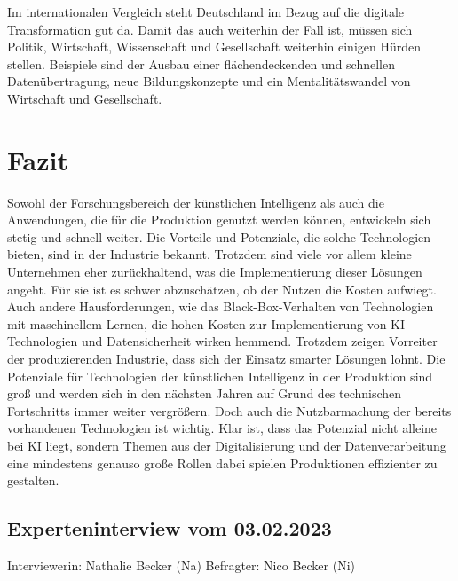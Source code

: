 \documentclass[a4paper,12pt, german]{report}
\begin{document}
Im internationalen Vergleich steht Deutschland im Bezug auf die digitale Transformation gut da. Damit das auch weiterhin der Fall ist, müssen sich Politik, Wirtschaft, Wissenschaft und Gesellschaft weiterhin einigen Hürden stellen. Beispiele sind der Ausbau einer flächendeckenden und schnellen Datenübertragung, neue Bildungskonzepte und ein Mentalitätswandel von Wirtschaft und Gesellschaft.\cite{36}

\chapter{Fazit}

Sowohl der Forschungsbereich der künstlichen Intelligenz als auch die Anwendungen, die für die Produktion genutzt werden können, entwickeln sich stetig und schnell weiter. Die Vorteile und Potenziale, die solche Technologien bieten, sind in der Industrie bekannt. Trotzdem sind viele vor allem kleine Unternehmen eher zurückhaltend, was die Implementierung dieser Lösungen angeht. Für sie ist es schwer abzuschätzen, ob der Nutzen die Kosten aufwiegt. Auch andere Hausforderungen, wie das Black-Box-Verhalten von Technologien mit maschinellem Lernen, die hohen Kosten zur Implementierung von KI-Technologien und Datensicherheit wirken hemmend. Trotzdem zeigen Vorreiter der produzierenden Industrie, dass sich der Einsatz smarter Lösungen lohnt. Die Potenziale für Technologien der künstlichen Intelligenz in der Produktion sind groß und werden sich in den nächsten Jahren auf Grund des technischen Fortschritts immer weiter vergrößern. Doch auch die Nutzbarmachung der bereits vorhandenen Technologien ist wichtig.\newline
Klar ist, dass das Potenzial nicht alleine bei KI liegt, sondern Themen aus der Digitalisierung und der Datenverarbeitung eine mindestens genauso große Rollen dabei spielen Produktionen effizienter zu gestalten.


\listoffigures

\clearpage



\clearpage
\appendix
{}
\section{Experteninterview vom 03.02.2023}
Interviewerin: Nathalie Becker (Na)\newline
Befragter: Nico Becker (Ni)
\\
\end{document}
